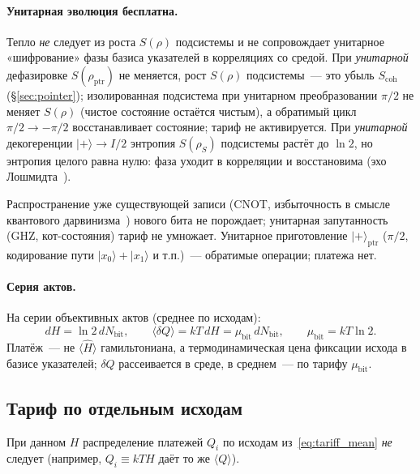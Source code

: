 \documentclass[11pt,a4paper]{article}
\newcommand{\Sref}[1]{\hyperref[#1]{\S\ref{#1}}}
\begin{document}
\paragraph{Унитарная эволюция бесплатна.}
Тепло \emph{не} следует из роста $S(\rho)$ подсистемы и не сопровождает унитарное «шифрование» фазы базиса указателей в корреляциях со средой. При \emph{унитарной} дефазировке $S(\rho_{\mathrm{ptr}})$ не меняется, рост $S(\rho)$ подсистемы~--- это убыль $S_{\mathrm{coh}}$ (\Sref{sec:pointer}); изолированная подсистема при унитарном преобразовании $\pi/2$ не меняет $S(\rho)$ (чистое состояние остаётся чистым), а обратимый цикл $\pi/2\to-\pi/2$ восстанавливает состояние; тариф не активируется. При \emph{унитарной} декогеренции $|{+}\rangle \to I/2$ энтропия $S(\rho_S)$ подсистемы растёт до $\ln 2$, но энтропия целого равна нулю: фаза уходит в корреляции и восстановима (эхо Лошмидта~\cite{gorin2006,goussev2012}).

Распространение уже существующей записи (CNOT, избыточность в смысле квантового дарвинизма~\cite{zurek2009}) нового бита не порождает; унитарная запутанность (GHZ, кот-состояния) тариф не умножает. Унитарное приготовление $|{+}\rangle_{\mathrm{ptr}}$ ($\pi/2$, кодирование пути $|x_0\rangle+|x_1\rangle$ и т.п.)~--- обратимые операции; платежа нет.

\paragraph{Серия актов.}
На серии объективных актов (среднее по исходам):
\begin{equation}
dH = \ln 2\,dN_{\mathrm{bit}}, \qquad \langle\delta Q\rangle = kT\,dH = \mu_{\mathrm{bit}}\,dN_{\mathrm{bit}}, \qquad \mu_{\mathrm{bit}} = kT\ln 2.
\end{equation}
Платёж~--- не $\langle\hat{H}\rangle$ гамильтониана, а термодинамическая цена фиксации исхода в базисе указателей; $\delta Q$ рассеивается в среде, в среднем~--- по тарифу $\mu_{\mathrm{bit}}$.

\subsection{Тариф по отдельным исходам}\label{sec:outcomes}

При данном $H$ распределение платежей $Q_i$ по исходам из~\eqref{eq:tariff_mean} \emph{не} следует (например, $Q_i \equiv kT H$ даёт то же $\langle Q\rangle$).
\end{document}
